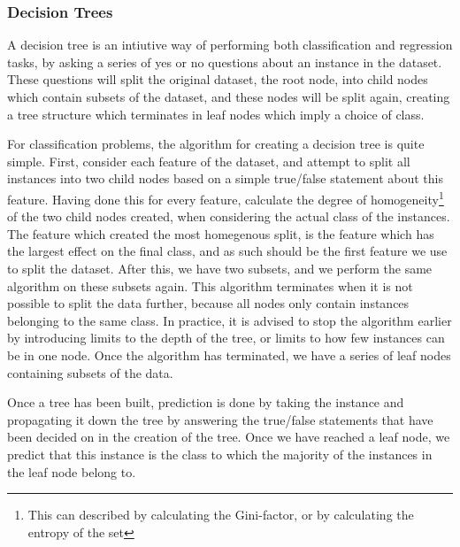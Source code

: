 \documentclass[onecolumn,10pt,cleanfoot]{asme2ej}
\begin{document}

\subsubsection{Decision Trees}

A decision tree is an intiutive way of performing both classification and regression tasks, by asking a series of yes or no questions about an instance in the dataset. These questions will split the original dataset, the root node, into child nodes which contain subsets of the dataset, and these nodes will be split again, creating a tree structure which terminates in leaf nodes which imply a choice of class.

For classification problems, the algorithm for creating a decision tree is quite simple. First, consider each feature of the dataset, and attempt to split all instances into two child nodes based on a simple true/false statement about this feature. Having done this for every feature, calculate the degree of homogeneity\footnote{This can described by calculating the Gini-factor, or by calculating the entropy of the set} of the two child nodes created, when considering the actual class of the instances. The feature which created the most homegenous split, is the feature which has the largest effect on the final class, and as such should be the first feature we use to split the dataset. After this, we have two subsets, and we perform the same algorithm on these subsets again. This algorithm terminates when it is not possible to split the data further, because all nodes only contain instances belonging to the same class. In practice, it is advised to stop the algorithm earlier by introducing limits to the depth of the tree, or limits to how few instances can be in one node. Once the algorithm has terminated, we have a series of leaf nodes containing subsets of the data.

Once a tree has been built, prediction is done by taking the instance and propagating it down the tree by answering the true/false statements that have been decided on in the creation of the tree. Once we have reached a leaf node, we predict that this instance is the class to which the majority of the instances in the leaf node belong to.
\end{document}
